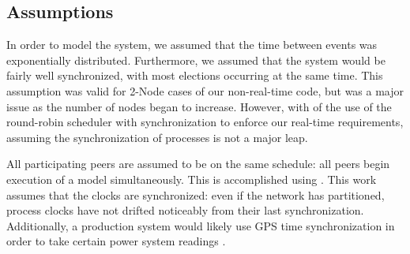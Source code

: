 \subsection{Assumptions}
In order to model the system, we assumed that the time between events was exponentially distributed. Furthermore, we assumed that the system would be fairly well synchronized, with most elections occurring at the same time. This assumption was valid for 2-Node cases of our non-real-time code, but was a major issue as the number of nodes began to increase. However, with of the use of the round-robin scheduler with synchronization to enforce our real-time requirements, assuming the synchronization of processes is not a major leap.

All participating peers are assumed to be on the same schedule: all peers begin execution of a model simultaneously. This is accomplished using \cite{DCS}. This work assumes that the clocks are synchronized: even if the network has partitioned, process clocks have not drifted noticeably from their last synchronization. Additionally, a production system would likely use GPS time synchronization in order to take certain power system readings \cite{PHASORREADINGS}.

